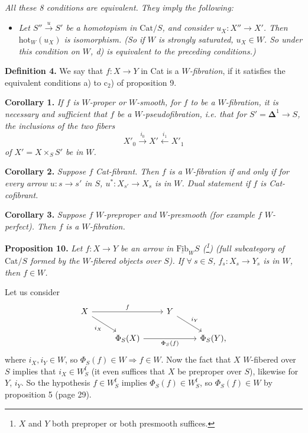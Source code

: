 \documentclass[11pt]{article}
\newcommand{\printedpage}[1]{\marginpar{\footnotesize p.~#1}}
\newcommand{\msp}[1]{\marginpar{\footnotesize [#1]}}
\newcommand{\hot}{\mathrm{hot}}
\newcommand{\Wf}{W^{\mathrm{f}}_S}
\begin{document}
\textit{All these 8 conditions are equivalent. They imply the following:}

\begin{itemize}[leftmargin=4em]
\item[\textit{d)}] \textit{Let $S'' \xrightarrow{u} S'$ be a homotopism in $\mathrm{Cat}/S$, and consider $u_X : X'' \longrightarrow X'$. Then $\hot_W(u_X)$ is isomorphism. (So if $W$ is strongly saturated, $u_X \in W$. So under this condition on $W$, d) is equivalent to the preceding conditions.)}
\end{itemize}

\msp{page 52}
\textbf{Definition 4.} We say that $f : X \longrightarrow Y$ in Cat is a \textit{$W$-fibration}, if it satisfies the equivalent conditions a) to c$_2$) of proposition 9.

\textbf{Corollary 1.} \textit{If $f$ is $W$-proper or $W$-smooth, for $f$ to be a $W$-fibration, it is necessary and sufficient that $f$ be a $W$-pseudofibration, i.e. that for $S' = \mathbf{\Delta}^1 \longrightarrow S$, the inclusions of the two fibers}
\[ X'_0 \xrightarrow{i_0} X' \xleftarrow{i_1} X'_1 \]
\textit{of $X' = X \times_S S'$ be in $W$.}

\textbf{Corollary 2.} \textit{Suppose $f$ \textup{Cat}-fibrant. Then $f$ is a $W$-fibration if and only if for every arrow $u : s \longrightarrow s'$ in $S$, $u^* : X_{s'} \longrightarrow X_s$ is in $W$. Dual statement if $f$ is \textup{Cat}-cofibrant.} %

\textbf{Corollary 3.} \textit{Suppose $f$ $W$-preproper and $W$-presmooth (for example $f$ $W$-perfect). Then $f$ is a $W$-fibration.}

\textbf{Proposition 10.} \textit{Let $f : X \longrightarrow Y$ be an arrow in $\underline{\mathrm{Fib}}_WS$ (\footnote[59]{$X$ and $Y$ both preproper or both presmooth suffices.}) (full subcategory of $\mathrm{Cat}/S$ formed by the $W$-fibered objects over $S$). If $\forall\ s \in S$, $f_s : X_s \longrightarrow Y_s$ is in $W$, then $f \in W$.}

Let us consider
\printedpage{38}
\[ \begin{tikzcd}
X \arrow[rr, "f"] \arrow[dr, "i_X"'] & & Y \arrow[dr, "i_Y"] & \\
 & \Phi_S(X) \arrow[rr, "\Phi_S(f)"'] & & \Phi_S(Y),
\end{tikzcd} \]
where $i_X, i_Y \in W$, so $\Phi_S(f) \in W \Rightarrow f \in W$. Now the fact that $X$ $W$-fibered over $S$ implies that $i_X \in \Wf$ (it even suffices that $X$ be preproper over $S$), likewise for $Y$, $i_Y$. So the hypothesis $f \in \Wf$ implies $\Phi_S(f) \in \Wf$, so $\Phi_S(f) \in W$ by proposition 5 (page 29).
\end{document}
